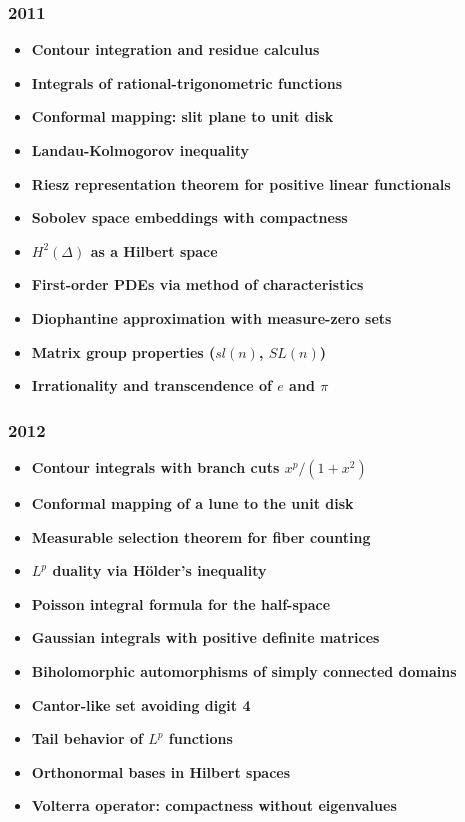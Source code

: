 \subsubsection*{2011}
\begin{itemize}
    \item \textbf{Contour integration and residue calculus}
    \item \textbf{Integrals of rational-trigonometric functions}
    \item \textbf{Conformal mapping: slit plane to unit disk}
    \item \textbf{Landau-Kolmogorov inequality}
    \item \textbf{Riesz representation theorem for positive linear functionals}
    \item \textbf{Sobolev space embeddings with compactness}
    \item \textbf{$H^2(\Delta)$ as a Hilbert space}
    \item \textbf{First-order PDEs via method of characteristics}
    \item \textbf{Diophantine approximation with measure-zero sets}
    \item \textbf{Matrix group properties ($sl(n)$, $SL(n)$)}
    \item \textbf{Irrationality and transcendence of $e$ and $\pi$}
\end{itemize}

\subsubsection*{2012}
\begin{itemize}
    \item \textbf{Contour integrals with branch cuts $x^p/(1+x^2)$}
    \item \textbf{Conformal mapping of a lune to the unit disk}
    \item \textbf{Measurable selection theorem for fiber counting}
    \item \textbf{$L^p$ duality via H\"older's inequality}
    \item \textbf{Poisson integral formula for the half-space}
    \item \textbf{Gaussian integrals with positive definite matrices}
    \item \textbf{Biholomorphic automorphisms of simply connected domains}
    \item \textbf{Cantor-like set avoiding digit 4}
    \item \textbf{Tail behavior of $L^p$ functions}
    \item \textbf{Orthonormal bases in Hilbert spaces}
    \item \textbf{Volterra operator: compactness without eigenvalues}
\end{itemize}

